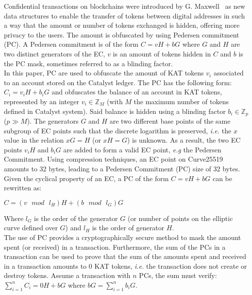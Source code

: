 Confidential transactions on blockchains were introduced by G. Maxwell~\cite{confidential} as new data structures to enable the transfer of tokens between digital addresses in such a way that the amount or number of tokens exchanged is hidden, offering more privacy to the users. The amount is obfuscated by using Pedersen commitment (PC). A Pedersen commitment is of the form $C = vH + bG$ where $G$ and $H$ are two distinct generators of the EC, $v$ is an amount of tokens hidden in $C$ and $b$ is the PC mask, sometimes referred to as a blinding factor.\\

In this paper, PC are used to obfuscate the amount of KAT tokens $v_{i}$ associated to an account stored on the Catalyst ledger. The PC has the following form: $C_{i} = v_{i}H + b_{i}G$ and obfuscates the balance of an account in KAT tokens, represented by an integer $v_{i} \in \mathbb{Z}_M$ (with $M$ the maximum number of tokens defined in Catalyst system). Said balance is hidden using a blinding factor $b_{i} \in \mathbb{Z}_p$ ($p \gg M$). The generators $G$ and $H$ are two different base points of the same subgroup of EC points such that the discrete logarithm is preserved, \textit{i.e.} the $x$ value in the relation $xG = H$ (or $xH = G$) is unknown. As a result, the two EC points $v_{i}H$ and $b_{i}G$ are added to form a valid EC point, \textit{e.g} the Pedersen Commitment. Using compression techniques, an EC point on Curve25519 amounts to 32 bytes, leading to a Pedersen Commitment (PC) size of 32 bytes.\\

Given the cyclical property of an EC, a PC of the form $C = vH + bG$ can be rewritten as:
\begin{center}
$C = (v \text{ $mod$ } l_H) H + (b \text{ $mod$ } l_G) G$
\end{center}
Where $l_G$ is the order of the generator $G$ (or number of points on the elliptic curve defined over $G$) and $l_H$ is the order of generator $H$.\\ 


The use of PC provides a cryptographically secure method to mask the amount spent (or received) in a transaction. Furthermore, the sum of the PCs in a transaction can be used to prove that the sum of the amounts spent and received in a transaction amounts to 0 KAT tokens, \textit{i.e.} the transaction does not create or destroy tokens. Assume a transaction with $n$ PCs, the sum must verify: $\sum_{i=1}^n C_i = 0H + bG$ where $bG = \sum_{i=1}^n b_iG$. \\

